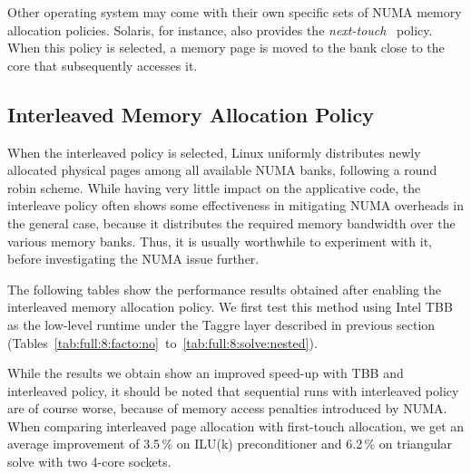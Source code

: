 Other operating system may come with their own specific sets of NUMA
memory allocation policies. Solaris, for instance, also provides the
\textit{next-touch}~\cite{next_touch}
policy. When this policy is
selected, a memory page is moved to the bank close to
the core that subsequently accesses it.

\subsection{Interleaved Memory Allocation Policy}\label{subsec:numa_inter}
When the interleaved policy is selected, Linux uniformly distributes
newly allocated physical pages among all available NUMA banks,
following a round robin scheme. While having very little impact on the
applicative code, the interleave policy often shows some effectiveness
in mitigating NUMA overheads in the general case, because it
distributes the required memory bandwidth over the various memory banks.
Thus, it is usually
worthwhile to experiment with it, before investigating the NUMA issue
further.

The following tables show the performance results obtained after
enabling the interleaved memory allocation policy. We first test this
method using Intel TBB as the low-level runtime under the Taggre layer described in previous section
(Tables~\ref{tab:full:8:facto:no}~to~\ref{tab:full:8:solve:nested}).



While the results we obtain show an improved speed-up with TBB and interleaved policy,
it should be noted that sequential runs with interleaved policy are of
course worse, because of memory access penalties introduced by NUMA.
When comparing
interleaved page allocation with first-touch allocation, we get
an average improvement of 3.5\,\% on ILU(k) preconditioner
and 6.2\,\% on triangular solve with two 4-core sockets.

